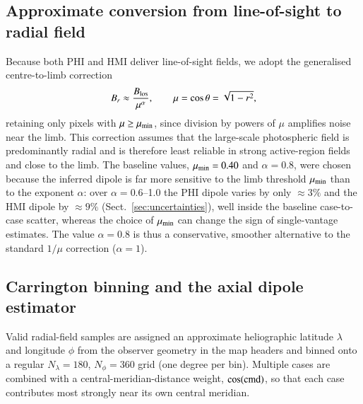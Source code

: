 \documentclass{aa}
\begin{document}
\subsection{Approximate conversion from line-of-sight to radial field}
\label{sec:methods-radial}

Because both PHI and HMI deliver line-of-sight fields, we adopt the generalised centre-to-limb correction
\begin{equation}
    B_r \approx \frac{B_{\rm los}}{\mu^{\alpha}}, \qquad \mu = \cos\theta = \sqrt{1 - r^2},
    \label{eq:br}
\end{equation}
retaining only pixels with $\mu \ge \mu_{\rm min}$, since division by powers of $\mu$ amplifies noise near the limb. This correction assumes that the large-scale photospheric field is predominantly radial and is therefore least reliable in strong active-region fields and close to the limb. The baseline values, $\mu_{\rm min} = 0.40$ and $\alpha = 0.8$, were chosen because the inferred dipole is far more sensitive to the limb threshold $\mu_{\rm min}$ than to the exponent $\alpha$: over $\alpha = 0.6$--1.0 the PHI dipole varies by only $\approx 3\%$ and the HMI dipole by $\approx 9\%$ (Sect.~\ref{sec:uncertainties}), well inside the baseline case-to-case scatter, whereas the choice of $\mu_{\rm min}$ can change the sign of single-vantage estimates. The value $\alpha = 0.8$ is thus a conservative, smoother alternative to the standard $1/\mu$ correction ($\alpha = 1$).

\subsection{Carrington binning and the axial dipole estimator}
\label{sec:methods-dipole}

Valid radial-field samples are assigned an approximate heliographic latitude $\lambda$ and longitude $\phi$ from the observer geometry in the map headers and binned onto a regular $N_\lambda = 180$, $N_\phi = 360$ grid (one degree per bin). Multiple cases are combined with a central-meridian-distance weight, $\cos(\rm cmd)$, so that each case contributes most strongly near its own central meridian.
\end{document}
